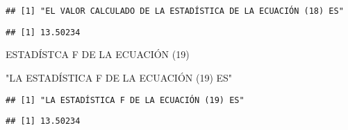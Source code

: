 \documentclass[
]{article}
\newenvironment{Shaded}{\begin{snugshade}}{\end{snugshade}}
\newcommand{\DecValTok}[1]{\textcolor[rgb]{0.00,0.00,0.81}{#1}}
\newcommand{\KeywordTok}[1]{\textcolor[rgb]{0.13,0.29,0.53}{\textbf{#1}}}
\newcommand{\NormalTok}[1]{#1}
\newcommand{\OperatorTok}[1]{\textcolor[rgb]{0.81,0.36,0.00}{\textbf{#1}}}
\newcommand{\StringTok}[1]{\textcolor[rgb]{0.31,0.60,0.02}{#1}}
\begin{document}
\begin{verbatim}
## [1] "EL VALOR CALCULADO DE LA ESTADÍSTICA DE LA ECUACIÓN (18) ES"
\end{verbatim}

\begin{Shaded}
\end{Shaded}

\begin{verbatim}
## [1] 13.50234
\end{verbatim}

ESTADÍSTCA F DE LA ECUACIÓN (19)

\begin{Shaded}
\begin{Highlighting}[]
\StringTok{"LA ESTADÍSTICA F DE LA ECUACIÓN (19) ES"}
\end{Highlighting}
\end{Shaded}

\begin{verbatim}
## [1] "LA ESTADÍSTICA F DE LA ECUACIÓN (19) ES"
\end{verbatim}

\begin{Shaded}
\end{Shaded}

\begin{verbatim}
## [1] 13.50234
\end{verbatim}
\end{document}
